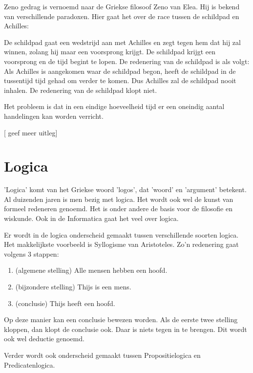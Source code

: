 \documentclass{article}
\begin{document}
		Zeno gedrag is vernoemd naar de Griekse filosoof Zeno van Elea. Hij is bekend van verschillende paradoxen. Hier gaat het over de race tussen de schildpad en Achilles:
		
		De schildpad gaat een wedstrijd aan met Achilles en zegt tegen hem dat hij zal winnen, zolang hij maar een voorsprong krijgt. De schildpad krijgt een voorsprong en de tijd begint te lopen. De redenering van de schildpad is als volgt: Als Achilles is aangekomen waar de schildpad begon, heeft de schildpad in de tussentijd tijd gehad om verder te komen. Dus Achilles zal de schildpad nooit inhalen. De redenering van de schildpad klopt niet.

		Het probleem is dat in een eindige hoeveelheid tijd er een oneindig aantal handelingen kan worden verricht.


		[ geef meer uitleg]
		
	\newpage
	
	
	\section{Logica}
	
	'Logica' komt van het Griekse woord 'logos', dat 'woord' en 'argument' betekent. Al duizenden jaren is men bezig met logica. Het wordt ook wel de kunst van formeel redeneren genoemd. Het is onder andere de basis voor de filosofie en wiskunde. Ook in de Informatica gaat het veel over logica.

	Er wordt in de logica onderscheid gemaakt tussen verschillende soorten logica. Het makkelijkste voorbeeld is Syllogisme van Aristoteles. Zo'n redenering gaat volgens 3 stappen:

	\begin{enumerate}
		\item (algemene stelling) Alle mensen hebben een hoofd.
		\item (bijzondere stelling) Thijs is een mens.
		\item (conclusie) Thijs heeft een hoofd.
	\end{enumerate}

	Op deze manier kan een conclusie bewezen worden. Als de eerste twee stelling kloppen, dan klopt de conclusie ook. Daar is niets tegen in te brengen. Dit wordt ook wel deductie genoemd.

	Verder wordt ook onderscheid gemaakt tussen Propositielogica en Predicatenlogica.
	
\end{document}
